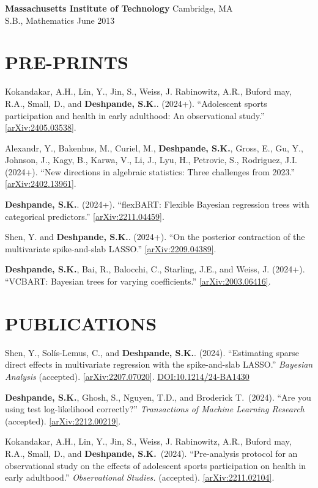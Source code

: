 \documentclass[margin]{res}
\def\skd{\textbf{Deshpande, S.K.}}
\begin{document}
\begin{resume}
                {\bf Massachusetts Institute of Technology} \hfill Cambridge, MA \\
                S.B., Mathematics \hfill June 2013 
  
  
\section{PRE-PRINTS}

Kokandakar, A.H., Lin, Y., Jin, S., Weiss, J. Rabinowitz, A.R., Buford may, R.A., Small, D., and \skd. (2024+). ``Adolescent sports participation and health in early adulthood: An observational study.'' \href{https://arxiv.org/abs/2405.03538}{[arXiv:2405.03538]}.

Alexandr, Y., Bakenhus, M., Curiel, M., \skd, Gross, E., Gu, Y., Johnson, J., Kagy, B., Karwa, V., Li, J., Lyu, H., Petrovic, S., Rodriguez, J.I. (2024+). ``New directions in algebraic statistics: Three challenges from 2023.'' \href{https://arxiv.org/abs/2402.13961}{[arXiv:2402.13961]}.

\skd. (2024+). ``flexBART: Flexible Bayesian regression trees with categorical predictors.'' \href{https://arxiv.org/abs/2211.04459}{[arXiv:2211.04459]}.

Shen, Y. and \skd. (2024+). ``On the posterior contraction of the multivariate spike-and-slab LASSO.'' \href{https://arxiv.org/abs/2209.04389}{[arXiv:2209.04389]}.

\skd, Bai, R., Balocchi, C., Starling, J.E., and Weiss, J. (2024+). ``VCBART: Bayesian trees for varying coefficients.'' \href{https://arxiv.org/abs/2003.06416}{[arXiv:2003.06416]}. 
\section{PUBLICATIONS}

Shen, Y., Sol\'{i}s-Lemus, C., and \skd. (2024). ``Estimating sparse direct effects in multivariate regression with the spike-and-slab LASSO.'' \textit{Bayesian Analysis} (accepted). \href{https://arxiv.org/abs/2207.07020}{[arXiv:2207.07020]}. \href{https://doi.org/10.1214/24-BA1430}{DOI:10.1214/24-BA1430}

\skd, Ghosh, S., Nguyen, T.D., and Broderick T.~(2024). ``Are you using test log-likelihood correctly?'' \textit{Transactions of Machine Learning Research} (accepted). \href{https://arxiv.org/abs/2212.00219}{[arXiv:2212.00219]}.

Kokandakar, A.H., Lin, Y., Jin, S., Weiss, J. Rabinowitz, A.R., Buford may, R.A., Small, D., and \skd~(2024). ``Pre-analysis protocol for an observational study on the effects of adolescent sports participation on health in early adulthood.'' \textit{Observational Studies.} (accepted). \href{https://arxiv.org/abs/2211.02104}{[arXiv:2211.02104]}.


\end{resume}
\end{document}
